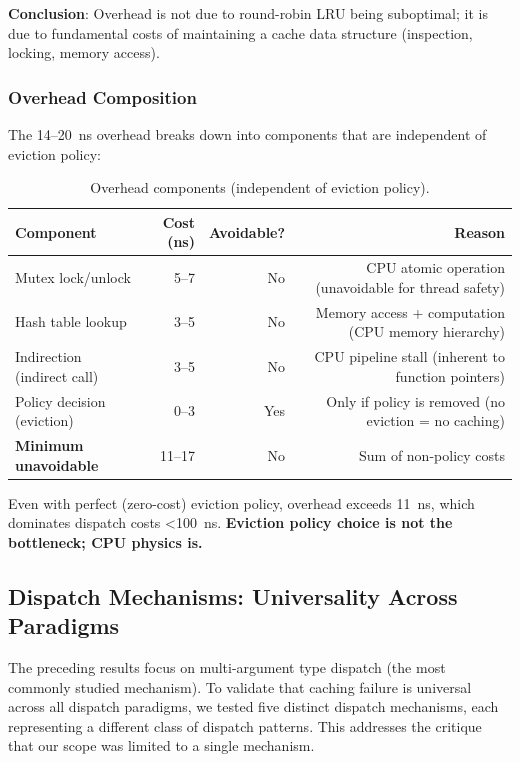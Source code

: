 \documentclass[sigplan,final]{acmart}
\begin{document}
\textbf{Conclusion}: Overhead is not due to round-robin LRU being suboptimal; it is due to
fundamental costs of maintaining a cache data structure (inspection, locking, memory access).

\subsubsection{Overhead Composition}

The 14--20~ns overhead breaks down into components that are independent of eviction policy:

\begin{table}[h]
\centering
\caption{Overhead components (independent of eviction policy).}
\label{tab:overhead-components}
\begin{tabular}{@{}lrrr@{}}
\toprule
\textbf{Component} & \textbf{Cost (ns)} & \textbf{Avoidable?} & \textbf{Reason} \\
\midrule
Mutex lock/unlock & 5--7 & No & CPU atomic operation (unavoidable for thread safety) \\
Hash table lookup & 3--5 & No & Memory access + computation (CPU memory hierarchy) \\
Indirection (indirect call) & 3--5 & No & CPU pipeline stall (inherent to function pointers) \\
Policy decision (eviction) & 0--3 & Yes & Only if policy is removed (no eviction = no caching) \\
\midrule
\textbf{Minimum unavoidable} & 11--17 & No & Sum of non-policy costs \\
\bottomrule
\end{tabular}
\end{table}

Even with perfect (zero-cost) eviction policy, overhead exceeds 11~ns, which dominates dispatch
costs <100~ns. \textbf{Eviction policy choice is not the bottleneck; CPU physics is.}

\subsection{Dispatch Mechanisms: Universality Across Paradigms}
\label{sec:dispatch-mechanisms}

The preceding results focus on multi-argument type dispatch (the most commonly studied mechanism).
To validate that caching failure is universal across all dispatch paradigms, we tested five distinct
dispatch mechanisms, each representing a different class of dispatch patterns. This addresses the
critique that our scope was limited to a single mechanism.
\end{document}
